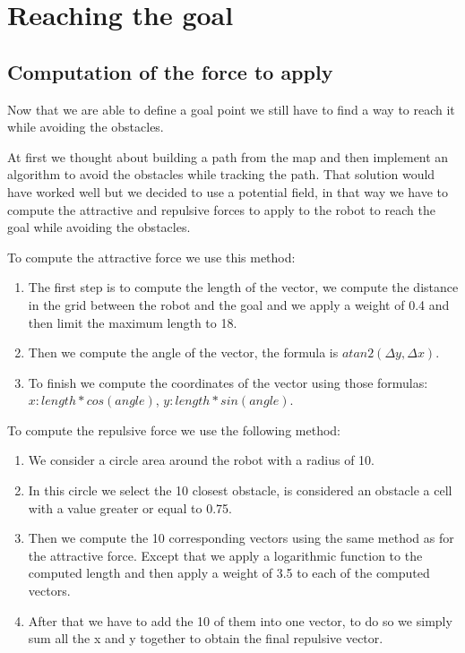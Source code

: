 \section{Reaching the goal}

\subsection{Computation of the force to apply}

Now that we are able to define a goal point we still have to find a way to reach it while avoiding the obstacles.

At first we thought about building a path from the map and then implement an algorithm to avoid the obstacles while tracking the path.
That solution would have worked well but we decided to use a potential field, in that way we have to compute the attractive and repulsive forces to apply to the robot to reach the goal while avoiding the obstacles.

To compute the attractive force we use this method:

\begin{enumerate}
    \item The first step is to compute the length of the vector, we compute the distance in the grid between the robot and the goal and we apply a weight of 0.4 and then limit the maximum length to 18.
    \item Then we compute the angle of the vector, the formula is $atan2(\Delta y, \Delta x)$.
    \item To finish we compute the coordinates of the vector using those formulas: $x: length * cos(angle)$, $y: length * sin(angle)$.
\end{enumerate}

To compute the repulsive force we use the following method:

\begin{enumerate}
    \item We consider a circle area around the robot with a radius of 10.
    \item In this circle we select the 10 closest obstacle, is considered an obstacle a cell with a value greater or equal to 0.75.
    \item Then we compute the 10 corresponding vectors using the same method as for the attractive force. Except that we apply a logarithmic function to the computed length and then apply a weight of 3.5 to each of the computed vectors.
    \item After that we have to add the 10 of them into one vector, to do so we simply sum all the x and y together to obtain the final repulsive vector.
\end{enumerate}

